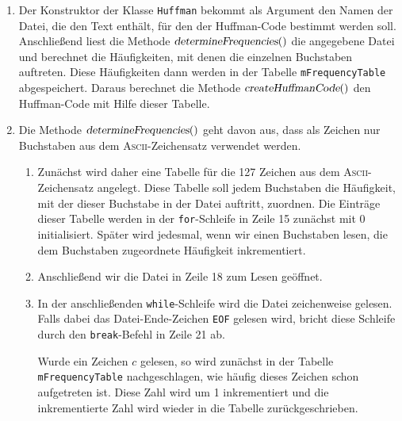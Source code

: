 \begin{enumerate}
\item Der Konstruktor der Klasse \texttt{Huffman} bekommt als Argument den Namen der Datei, die
      den Text enth\"alt, f\"ur den der Huffman-Code bestimmt werden soll.  Anschlie{\ss}end liest
      die Methode $\textsl{determineFrequencies}()$  die angegebene Datei und berechnet die H\"aufigkeiten,
      mit denen die einzelnen Buchstaben auftreten.  Diese H\"aufigkeiten dann werden in der
      Tabelle \texttt{mFrequencyTable} abgespeichert.  Daraus berechnet die Methode
      $\textsl{createHuffmanCode}()$ den Huffman-Code mit Hilfe dieser Tabelle.
\item Die Methode $\textsl{determineFrequencies}()$ geht davon aus, dass als Zeichen nur
      Buchstaben aus dem \textsc{Ascii}-Zeichensatz verwendet werden.
      \begin{enumerate}
      \item Zun\"achst wird daher eine Tabelle f\"ur die 127 Zeichen aus dem
            \textsc{Ascii}-Zeichensatz angelegt.   Diese Tabelle soll jedem 
            Buchstaben die H\"aufigkeit, mit der dieser Buchstabe in der Datei auftritt,
            zuordnen.  Die Eintr\"age dieser Tabelle werden 
            in der \texttt{for}-Schleife in Zeile 15 zun\"achst mit 0 initialisiert.
            Sp\"ater wird jedesmal,  wenn wir einen Buchstaben lesen, die dem Buchstaben
            zugeordnete H\"aufigkeit inkrementiert.
      \item Anschlie{\ss}end wir die Datei in Zeile 18 zum Lesen ge\"offnet.
      \item In der anschlie{\ss}enden \texttt{while}-Schleife wird die Datei zeichenweise
            gelesen.  Falls dabei das Datei-Ende-Zeichen \texttt{EOF} gelesen wird,
            bricht diese Schleife durch den \texttt{break}-Befehl in Zeile 21 ab. 
            
            Wurde ein Zeichen $c$ gelesen, so wird zun\"achst in der Tabelle
            \texttt{mFrequencyTable} nachgeschlagen, wie h\"aufig dieses Zeichen schon
            aufgetreten ist.  Diese Zahl wird um 1 inkrementiert und die inkrementierte
            Zahl wird wieder in die Tabelle zur\"uckgeschrieben.
            

\end{enumerate}
\end{enumerate}
